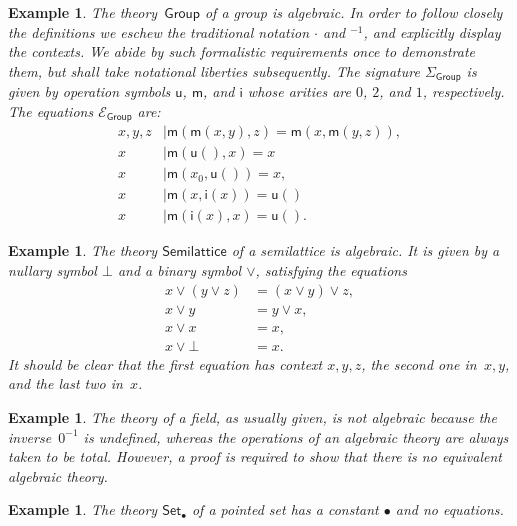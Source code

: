 \documentclass{amsart}
\newcommand{\theory}[1]{\mathsf{#1}} %
\newcommand{\signature}[1]{\Sigma_{\theory{#1}}} %
\newcommand{\equations}[1]{\mathcal{E}_{\theory{#1}}} %
\newtheorem{example}[definition]{Example}
\begin{document}
\begin{example}
  \label{ex:theory-group}
  The theory~$\theory{Group}$ of a group is algebraic. In order to follow closely the
  definitions we eschew the traditional notation $\cdot$ and ${}^{-1}$, and explicitly
  display the contexts. We abide by such formalistic requirements once to demonstrate
  them, but shall take notational liberties subsequently.
  The signature $\signature{Group}$ is given by operation symbols $\mathsf{u}$,
  $\mathsf{m}$, and $\mathsf{i}$ whose arities are $0$, $2$, and $1$, respectively. The
  equations $\equations{Group}$ are:
  \begin{align*}
    x, y, z &\mid \mathsf{m}(\mathsf{m}(x, y), z) = \mathsf{m}(x, \mathsf{m}(y, z)),\\
    x &\mid \mathsf{m}(\mathsf{u}(), x) = x \\
    x &\mid \mathsf{m}(x_0, \mathsf{u}()) = x,\\
    x &\mid \mathsf{m}(x, \mathsf{i}(x)) = \mathsf{u}()\\
    x &\mid \mathsf{m}(\mathsf{i}(x), x) = \mathsf{u}().
  \end{align*}
\end{example}

\begin{example}
  \label{ex:semi-lattice}
  The theory $\theory{Semilattice}$ of a semilattice is algebraic. It is given by a
  nullary symbol $\bot$ and a binary symbol $\vee$, satisfying the equations
  \begin{align*}
    x \vee (y \vee z) &= (x \vee y) \vee z,\\
    x \vee y &= y \vee x,\\
    x \vee x &= x,\\
    x \vee \bot &= x.
  \end{align*}
  It should be clear that the first equation has context $x, y, z$, the second one
  in~$x, y$, and the last two in~$x$.
\end{example}

\begin{example}
  \label{ex:field}
  The theory of a field, as usually given, is not algebraic because the inverse~$0^{-1}$
  is undefined, whereas the operations of an algebraic theory are always taken to be
  total. However, a proof is required to show that there is no equivalent algebraic theory.
\end{example}

\begin{example}
  \label{ex:pointed-set}
  The theory $\theory{Set_\bullet}$ of a \emph{pointed set} has a constant $\bullet$ and
  no equations.
\end{example}
\end{document}
